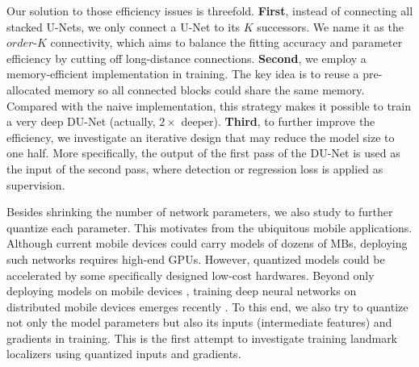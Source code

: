 \documentclass[runningheads]{llncs}
\begin{document}
Our solution to those efficiency issues is threefold. {\bf First}, instead of connecting all stacked U-Nets, we only connect a U-Net to its $K$ successors. We name it as the $order$-$K$ connectivity, which aims to balance the fitting accuracy and parameter efficiency by cutting off long-distance connections. {\bf Second}, we employ a memory-efficient implementation in training. The key idea is to reuse a pre-allocated memory so all connected blocks could share the same memory. Compared with the naive implementation, this strategy makes it possible to train a very deep DU-Net (actually, $2\times$ deeper). {\bf Third}, to further improve the efficiency, we investigate an iterative design that may reduce the model size to one half. More specifically, the output of the first pass of the DU-Net is used as the input of the second pass, where detection or regression loss is applied as supervision. 

Besides shrinking the number of network parameters, we also study to further quantize each parameter. This motivates from the ubiquitous mobile applications. Although current mobile devices could carry models of dozens of MBs, deploying such networks requires high-end GPUs. However, quantized models could be accelerated by some specifically designed low-cost hardwares. Beyond only deploying models on mobile devices \cite{li2017deeprebirth}, training deep neural networks on distributed mobile devices emerges recently \cite{mcmahan2016communication}. To this end, we also try to quantize not only the model parameters but also its inputs (intermediate features) and gradients in training. This is the first attempt to investigate training landmark localizers using quantized inputs and gradients.
\end{document}
